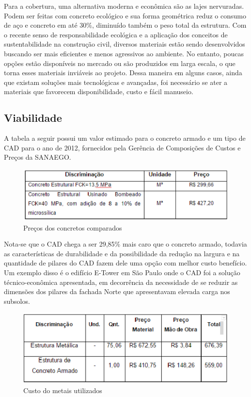Para a cobertura, uma alternativa moderna e econômica são as lajes nervuradas. Podem ser feitas com concreto ecológico e sua forma geométrica reduz o consumo de aço e concreto em até 30\%, diminuído também o peso total da estrutura.
Com o recente senso de responsabilidade ecológica e a aplicação dos conceitos de sustentabilidade na construção civil, diversos materiais estão sendo desenvolvidos buscando ser mais eficientes e menos agressivos ao ambiente. No entanto, poucas opções estão disponíveis no mercado ou são produzidos em larga escala, o que torna esses materiais inviáveis ao projeto. Dessa maneira em alguns casos, ainda que existam soluções mais tecnológicas e avançadas, foi necessário se ater a materiais que favorecem disponibilidade, custo e fácil manuseio.

\subsection{Viabilidade}

A tabela a seguir possui um valor estimado para o concreto armado e um tipo de CAD para o ano de 2012, fornecidos pela Gerência de Composições de Custos e Preços da SANAEGO.

\begin{figure}[!h]
\centering
\includegraphics[keepaspectratio=true,scale=1]{figuras/tabela_com_precos_concreto.eps}
\caption{  Preços dos concretos comparados
}
\end{figure}

Nota-se que o CAD chega a ser 29,85\% mais caro que o concreto armado, todavia as características de durabilidade e da possibilidade da redução na largura e na quantidade de pilares do CAD fazem dele uma opção com melhor custo benefício. Um exemplo disso é o edifício E-Tower em São Paulo onde o CAD foi a solução técnico-econômica apresentada, em decorrência da necessidade de se reduzir as dimensões dos pilares da fachada Norte que apresentavam elevada carga nos subsolos.

\begin{figure}[!h]
\centering
\includegraphics[keepaspectratio=true,scale=1]{figuras/precometais.eps}
\caption{Custo do metais utilizados}
\end{figure}

